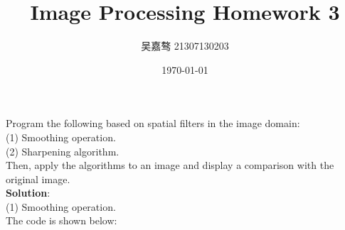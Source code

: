 \documentclass[UTF8]{ctexart}
\title{\textbf{Image Processing Homework 3}}
\author{吴嘉骜 21307130203}
\date{\today}
\begin{document}
\maketitle

\noindent
\section{}
\setlength{\parindent}{0pt}
Program the following based on spatial filters in the image domain:\\
(1) Smoothing operation.\\
(2) Sharpening algorithm.\\
Then, apply the algorithms to an image and display a comparison with the original image.\\
\textbf{Solution}:\\
(1) Smoothing operation.\\
The code is shown below:
\end{document}
